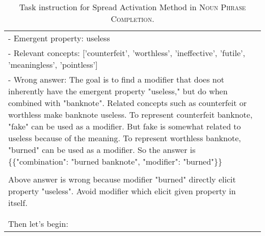 \begin{table*}[htbp]
\begin{tabular}{@{}p{\linewidth}@{}}
- Emergent property: useless\\
- Relevant concepts: ['counterfeit', 'worthless', 'ineffective', 'futile', 'meaningless', 'pointless']\\
- Wrong answer: The goal is to find a modifier that does not inherently have the emergent property "useless," but do when combined with "banknote". Related concepts such as counterfeit or worthless make banknote useless. To represent counterfeit banknote, "fake" can be used as a modifier. But fake is somewhat related to useless because of the meaning. To represent worthless banknote, "burned" can be used as a modifier. So the answer is \{\{"combination": "burned banknote", "modifier": "burned"\}\}\\
\\
Above answer is wrong because modifier "burned" directly elicit property "useless".  Avoid modifier which elicit given property in itself.\\
\\
\\
Then let's begin:\\
\bottomrule
\end{tabular}
    \caption{Task instruction for Spread Activation Method in \textsc{Noun Phrase Completion}.}
    \label{tab:npc_prompt_sa}
\end{table*}